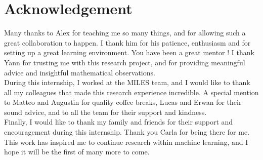 %
\chapter*{Acknowledgement}\label{sec:acknowledgement}
\vspace*{-10mm}
Many thanks to Alex for teaching me so many things, and for allowing such a great collaboration to happen. I thank him for his patience, enthusiasm and for setting up a great learning environment. You have been a great mentor !
I thank Yann for trusting me with this research project, and for providing meaningful advice and insightful mathematical observations. 
\\
During this internship, I worked at the MILES team, and I would like to thank all my colleagues that made this research experience incredible. A special mention to Matteo and Augustin for quality coffee breaks, Lucas and Erwan for their sound advice, and to all the team for their support and kindness.
\\
Finally, I would like to thank my family and friends for their support and encouragement during this internship. Thank you Carla for being there for me.
\\
This work has inspired me to continue research within machine learning, and I hope it will be the first of many more to come.

